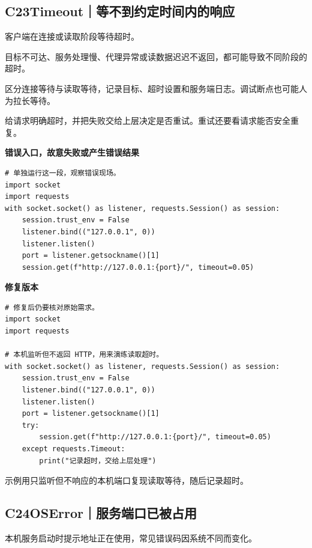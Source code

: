 \documentclass[UTF8,a4paper,oneside,openany,fontset=none,11pt]{ctexbook}
\newcommand{\code}[1]{\texttt{\detokenize{#1}}}
\newcommand{\CaseStep}[2]{\par\smallskip{\bfseries\color{Muted}#1}\enspace #2\par}
\begin{document}
\subsection*{C23\enspace Timeout｜等不到约定时间内的响应}

\CaseStep{现象}{客户端在连接或读取阶段等待超时。}

\CaseStep{原因}{目标不可达、服务处理慢、代理异常或读数据迟迟不返回，都可能导致不同阶段的超时。}

\CaseStep{排查}{区分连接等待与读取等待，记录目标、超时设置和服务端日志。调试断点也可能人为拉长等待。}

\CaseStep{修复}{给请求明确超时，并把失败交给上层决定是否重试。重试还要看请求能否安全重复。}

\textbf{错误入口，故意失败或产生错误结果}

\begin{lstlisting}[style=errorcode,title={错误复现（故意失败或错误结果）：\code{case_23_bad.py.txt}}]
# 单独运行这一段，观察错误现场。
import socket
import requests
with socket.socket() as listener, requests.Session() as session:
    session.trust_env = False
    listener.bind(("127.0.0.1", 0))
    listener.listen()
    port = listener.getsockname()[1]
    session.get(f"http://127.0.0.1:{port}/", timeout=0.05)
\end{lstlisting}

\textbf{修复版本}

\begin{lstlisting}[title={\code{case_23.py}}]
# 修复后仍要核对原始需求。
import socket
import requests

# 本机监听但不返回 HTTP，用来演练读取超时。
with socket.socket() as listener, requests.Session() as session:
    session.trust_env = False
    listener.bind(("127.0.0.1", 0))
    listener.listen()
    port = listener.getsockname()[1]
    try:
        session.get(f"http://127.0.0.1:{port}/", timeout=0.05)
    except requests.Timeout:
        print("记录超时，交给上层处理")
\end{lstlisting}

\CaseStep{复验}{示例用只监听但不响应的本机端口复现读取等待，随后记录超时。}

\subsection*{C24\enspace OSError｜服务端口已被占用}

\CaseStep{现象}{本机服务启动时提示地址正在使用，常见错误码因系统不同而变化。}
\end{document}
